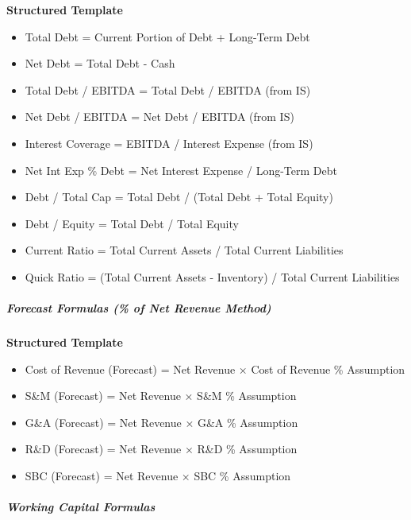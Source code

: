 \documentclass[11pt]{article}
\begin{document}
\textbf{Structured Template}
\begin{itemize}[leftmargin=*,itemsep=2pt,topsep=2pt]
\item {} Total Debt = Current Portion of Debt + Long-Term Debt
\item {} Net Debt = Total Debt - Cash
\item {} Total Debt / EBITDA = Total Debt / EBITDA (from IS)
\item {} Net Debt / EBITDA = Net Debt / EBITDA (from IS)
\item {} Interest Coverage = EBITDA / Interest Expense (from IS)
\item {} Net Int Exp \% Debt = Net Interest Expense / Long-Term Debt
\item {} Debt / Total Cap = Total Debt / (Total Debt + Total Equity)
\item {} Debt / Equity = Total Debt / Total Equity
\item {} Current Ratio = Total Current Assets / Total Current Liabilities
\item {} Quick Ratio = (Total Current Assets - Inventory) / Total Current Liabilities
\end{itemize}

\subparagraph{Forecast Formulas (\% of Net Revenue Method)}\mbox{}\par

\textbf{Structured Template}
\begin{itemize}[leftmargin=*,itemsep=2pt,topsep=2pt]
\item {} Cost of Revenue (Forecast) = Net Revenue × Cost of Revenue \% Assumption
\item {} S\&M (Forecast) = Net Revenue × S\&M \% Assumption
\item {} G\&A (Forecast) = Net Revenue × G\&A \% Assumption
\item {} R\&D (Forecast) = Net Revenue × R\&D \% Assumption
\item {} SBC (Forecast) = Net Revenue × SBC \% Assumption
\end{itemize}

\subparagraph{Working Capital Formulas}\mbox{}\par
\end{document}

